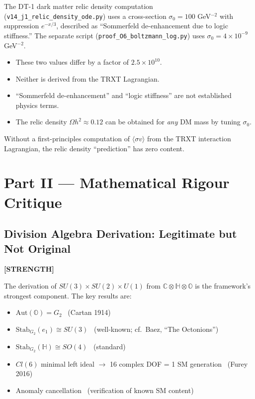 \documentclass[12pt, a4paper]{article}
\newcommand{\positive}{\textcolor{positive}{\textbf{[STRENGTH]}}}
\begin{document}
The DT-1 dark matter relic density computation (\texttt{v14\_j1\_relic\_density\_ode.py}) uses a cross-section $\sigma_0 = 100$ GeV$^{-2}$ with suppression $e^{-x/3}$, described as ``Sommerfeld de-enhancement due to logic stiffness.'' The separate script (\texttt{proof\_O6\_boltzmann\_log.py}) uses $\sigma_0 = 4 \times 10^{-9}$ GeV$^{-2}$.

\begin{itemize}
    \item These two values differ by a factor of $2.5 \times 10^{10}$.
    \item Neither is derived from the TRXT Lagrangian.
    \item ``Sommerfeld de-enhancement'' and ``logic stiffness'' are not established physics terms.
    \item The relic density $\Omega h^2 \approx 0.12$ can be obtained for \emph{any} DM mass by tuning $\sigma_0$.
\end{itemize}

Without a first-principles computation of $\langle \sigma v \rangle$ from the TRXT interaction Lagrangian, the relic density ``prediction'' has zero content.

\section{Part II --- Mathematical Rigour Critique}

\subsection{Division Algebra Derivation: Legitimate but Not Original}
\positive{}

The derivation of $SU(3) \times SU(2) \times U(1)$ from $\mathbb{C} \otimes \mathbb{H} \otimes \mathbb{O}$ is the framework's strongest component. The key results are:

\begin{itemize}
    \item $\text{Aut}(\mathbb{O}) = G_2$ \checkmark\ (Cartan 1914)
    \item $\text{Stab}_{G_2}(e_1) \cong SU(3)$ \checkmark\ (well-known; cf.\ Baez, ``The Octonions'')
    \item $\text{Stab}_{G_2}(\mathbb{H}) \cong SO(4)$ \checkmark\ (standard)
    \item $Cl(6)$ minimal left ideal $\to$ 16 complex DOF = 1 SM generation \checkmark\ (Furey 2016)
    \item Anomaly cancellation \checkmark\ (verification of known SM content)
\end{itemize}
\end{document}
